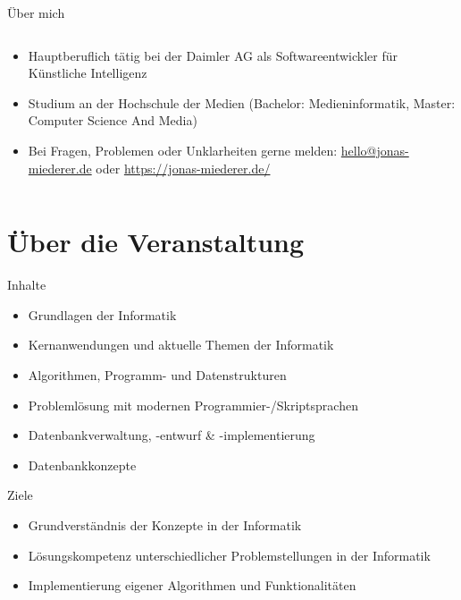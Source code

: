 \begin{frame}{Über mich}
\begin{columns}
\begin{column}{0.6\textwidth}
\begin{itemize}
                	\item Hauptberuflich tätig bei der Daimler AG als Softwareentwickler für Künstliche Intelligenz
                	\item Studium an der Hochschule der Medien (Bachelor: Medieninformatik, Master: Computer Science And Media)
                	\item Bei Fragen, Problemen oder Unklarheiten gerne melden: \href{mailto:dhbw@jonas-miederer.de}{hello@jonas-miederer.de} oder \href{https://jonas-miederer.de/}{https://jonas-miederer.de/}
          	    \end{itemize}
            \end{column}
        \end{columns}
    \end{frame}
          
   \section{Über die Veranstaltung}  
     \begin{frame}{Inhalte}
        
        \begin{itemize}
            \item Grundlagen der Informatik
            \item Kernanwendungen und aktuelle Themen der Informatik
            \item Algorithmen, Programm- und Datenstrukturen
            \item Problemlösung mit modernen Programmier-/Skriptsprachen
            \item Datenbankverwaltung, -entwurf \& -implementierung
            \item Datenbankkonzepte
        \end{itemize}
    \end{frame}
    
    \begin{frame}{Ziele}
        \begin{itemize}
            \item Grundverständnis der Konzepte in der Informatik
            \item Lösungskompetenz unterschiedlicher Problemstellungen in der Informatik
            \item Implementierung eigener Algorithmen und Funktionalitäten
        \end{itemize}
    \end{frame}
    
